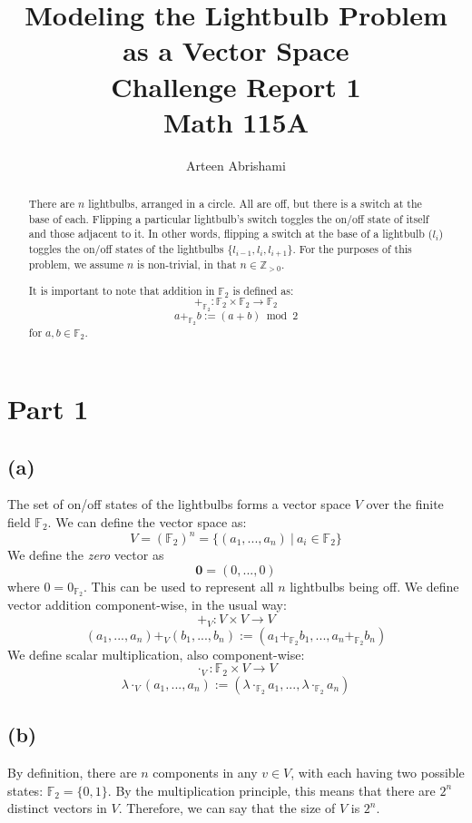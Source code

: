 \documentclass[12pt, letterpaper]{article}
\title{
Modeling the Lightbulb Problem as a Vector Space \\
\large Challenge Report 1 \\
Math 115A}
\author{Arteen Abrishami}
\date{}
\newcommand{\F}{\mathbb{F}}
\newcommand{\Z}{\mathbb{Z}}
\newcommand{\0}{\textbf{0}}
\newcommand{\1}{\textbf{1}}
\begin{document}
\maketitle
\begin{abstract}
There are $n$ lightbulbs, arranged in a circle. All are off, but there is a switch at the base of each. Flipping a particular lightbulb's switch toggles the on/off state of itself and those adjacent to it. In other words, flipping a switch at the base of a lightbulb ($l_i$) toggles the on/off states of the lightbulbs $\{l_{i-1},l_i,l_{i+1}\}$. For the purposes of this problem, we assume $n$ is non-trivial, in that $n \in \Z_{>0}$.

It is important to note that addition in $\F_2$ is defined as: $$+_{\F_2}: \F_2 \times \F_2 \rightarrow \F_2$$ $$ a +_{\F_2} b := (a + b)\bmod{2} $$ for $a, b \in \F_2$.
\end{abstract}
\section*{Part 1}

\subsection*{(a)}

The set of on/off states of the lightbulbs forms a vector space $V$ over the finite field $\F_2$. We can define the vector space as: $$V = (\F{_2})^n = \{ (a_1, ..., a_n) \: | \: a_i \in \F_2 \} $$ We define the \emph{zero} vector as $$\0 = (0, ..., 0)$$ where $0=0_{\F_2}$. This can be used to represent all $n$ lightbulbs being off. 
We define vector addition component-wise, in the usual way: $$+_V: V \times V \rightarrow V$$ $$(a_1, ..., a_n) +_V (b_1, ..., b_n) := (a_1 +_{\F_2} b_1, ..., a_n +_{\F_2} b_n)$$ We define scalar multiplication, also component-wise: $$\cdot_V: \F_2 \times V \rightarrow V$$ $$ \lambda \cdot_V (a_1, ..., a_n) := (\lambda \cdot_{\F_2} a_1, ..., \lambda \cdot_{\F_2} a_n)$$ 

\subsection*{(b)}

By definition, there are $n$ components in any $v\in V$, with each having two possible states: $\F_2 = \{0, 1\}$. By the multiplication principle, this means that there are $2^n$ distinct vectors in $V$. Therefore, we can say that the size of $V$ is $2^n$. 
\end{document}
